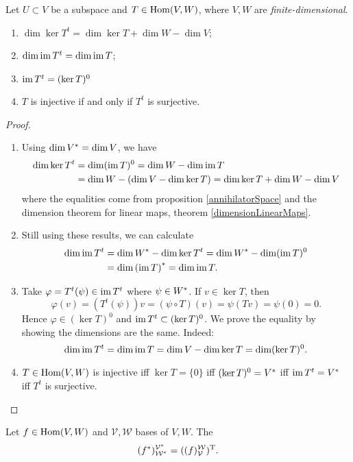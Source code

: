 \begin{proposition}
Let $U\subset V$ be a subspace and $T\in \operatorname{Hom}(V,W)$, where $V,W$ are \emph{finite-dimensional}.
\begin{enumerate}
\item $\dim\ker T^t = \dim \ker T + \dim W - \dim V$;
\item $\dim\operatorname{im} T^t = \dim \operatorname{im} T$;
\item $\operatorname{im} T^t = (\ker T)^0$
\item $T$ is injective \textup{if and only if} $T^t$ is surjective.
\end{enumerate}
\end{proposition}
\begin{proof}
\mbox{}
\begin{enumerate}
\item Using $\dim {V}^* = \dim V$, we have
\begin{align*}
\dim \ker T^t &= \dim(\operatorname{im} T)^0 = \dim W-\dim \operatorname{im} T \\
&= \dim W - (\dim V - \dim \ker T) = \dim \ker T + \dim W - \dim V
\end{align*}
where the equalities come from proposition \ref{annihilatorSpace} and the dimension theorem for linear maps, theorem \ref{dimensionLinearMaps}.
\item Still using these results, we can calculate
\begin{align*}
\dim \operatorname{im} T^t &= \dim {W}^* - \dim \ker T^t = \dim {W}^* - \dim (\operatorname{im} T)^0 \\
&= \dim {(\operatorname{im}T)}^* = \dim \operatorname{im} T.
\end{align*}
\item Take $\varphi = T^t(\psi) \in \operatorname{im} T^t$ where $\psi \in {W}^*$. If $v\in \ker T$, then
\[ \varphi(v) = \left(T^t(\psi)\right)v = (\psi\circ T)(v) = \psi(Tv) = \psi(0) = 0. \]
Hence $\varphi \in (\ker T)^0$ and $\operatorname{im} T^t\subset (\ker T)^0$. We prove the equality by showing the dimensions are the same. Indeed:
\[ \dim \operatorname{im} T^t = \dim \operatorname{im} T = \dim V - \dim \ker T = \dim(\ker T)^0. \]
\item $T\in\operatorname{Hom}(V,W)$ is injective iff $\ker T = \{0\}$ iff $(\ker T)^0 = {V}^*$ iff $\operatorname{im} T^t = {V}^*$ iff $T^t$ is surjective.
\end{enumerate}
\end{proof}

\begin{proposition} \label{transpDual}
Let $f\in\operatorname{Hom}(V,W)$ and $\mathcal{V}, \mathcal{W}$ bases of $V,W$. The
\[ (f^*)^{\mathcal{V}^*}_{\mathcal{W}^*} = ((f)^{\mathcal{W}}_{\mathcal{V}})^{\mathrm{T}}. \] 
\end{proposition}


